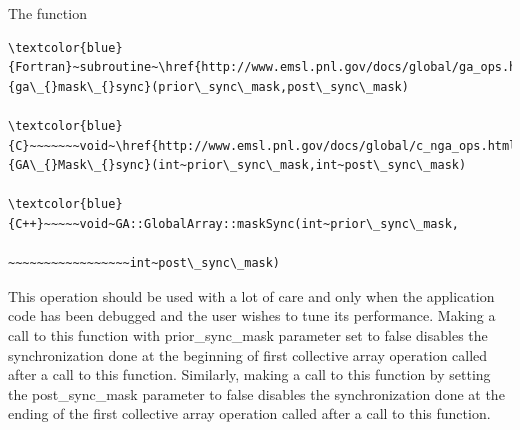 The function
\begin{verbatim}
\textcolor{blue}{Fortran}~subroutine~\href{http://www.emsl.pnl.gov/docs/global/ga_ops.html\#ga_mask_sync}{ga\_{}mask\_{}sync}(prior\_sync\_mask,post\_sync\_mask)

\textcolor{blue}{C}~~~~~~~void~\href{http://www.emsl.pnl.gov/docs/global/c_nga_ops.html\#ga_mask_sync}{GA\_{}Mask\_{}sync}(int~prior\_sync\_mask,int~post\_sync\_mask)

\textcolor{blue}{C++}~~~~~void~GA::GlobalArray::maskSync(int~prior\_sync\_mask,

~~~~~~~~~~~~~~~~~int~post\_sync\_mask)
\end{verbatim}
This operation should be used with a lot of care and only when the
application code has been debugged and the user wishes to tune its
performance. Making a call to this function with prior\_sync\_mask
parameter set to false disables the synchronization done at the beginning
of first collective array operation called after a call to this function.
Similarly, making a call to this function by setting the post\_sync\_mask
parameter to false disables the synchronization done at the ending
of the first collective array operation called after a call to this
function.
